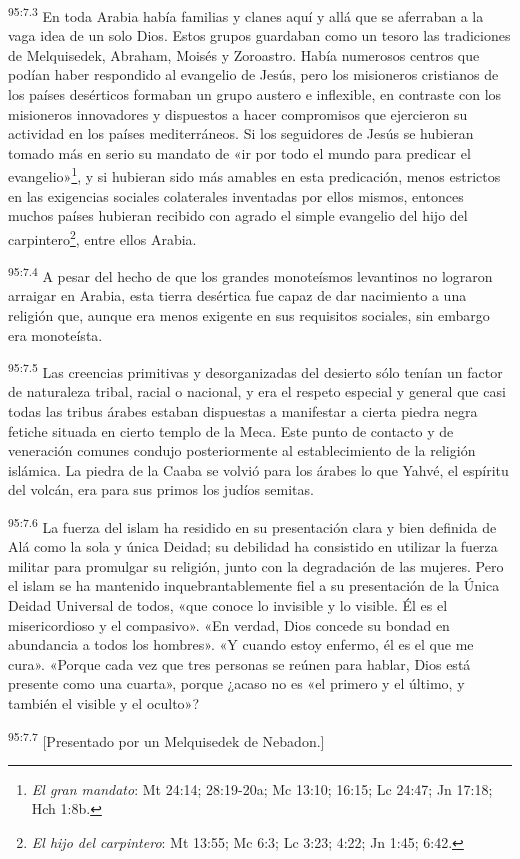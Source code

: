 \par
\textsuperscript{95:7.3} En toda Arabia había familias y clanes aquí y allá que se aferraban a la vaga idea de un solo Dios. Estos grupos guardaban como un tesoro las tradiciones de Melquisedek, Abraham, Moisés y Zoroastro. Había numerosos centros que podían haber respondido al evangelio de Jesús, pero los misioneros cristianos de los países desérticos formaban un grupo austero e inflexible, en contraste con los misioneros innovadores y dispuestos a hacer compromisos que ejercieron su actividad en los países mediterráneos. Si los seguidores de Jesús se hubieran tomado más en serio su mandato de «ir por todo el mundo para predicar el evangelio»\footnote{\textit{El gran mandato}: Mt 24:14; 28:19-20a; Mc 13:10; 16:15; Lc 24:47; Jn 17:18; Hch 1:8b.}, y si hubieran sido más amables en esta predicación, menos estrictos en las exigencias sociales colaterales inventadas por ellos mismos, entonces muchos países hubieran recibido con agrado el simple evangelio del hijo del carpintero\footnote{\textit{El hijo del carpintero}: Mt 13:55; Mc 6:3; Lc 3:23; 4:22; Jn 1:45; 6:42.}, entre ellos Arabia.

\par
\textsuperscript{95:7.4} A pesar del hecho de que los grandes monoteísmos levantinos no lograron arraigar en Arabia, esta tierra desértica fue capaz de dar nacimiento a una religión que, aunque era menos exigente en sus requisitos sociales, sin embargo era monoteísta.

\par
\textsuperscript{95:7.5} Las creencias primitivas y desorganizadas del desierto sólo tenían un factor de naturaleza tribal, racial o nacional, y era el respeto especial y general que casi todas las tribus árabes estaban dispuestas a manifestar a cierta piedra negra fetiche situada en cierto templo de la Meca. Este punto de contacto y de veneración comunes condujo posteriormente al establecimiento de la religión islámica. La piedra de la Caaba se volvió para los árabes lo que Yahvé, el espíritu del volcán, era para sus primos los judíos semitas.

\par
\textsuperscript{95:7.6} La fuerza del islam ha residido en su presentación clara y bien definida de Alá como la sola y única Deidad; su debilidad ha consistido en utilizar la fuerza militar para promulgar su religión, junto con la degradación de las mujeres. Pero el islam se ha mantenido inquebrantablemente fiel a su presentación de la Única Deidad Universal de todos, «que conoce lo invisible y lo visible.
Él es el misericordioso y el compasivo». «En verdad, Dios concede su bondad en abundancia a todos los hombres». «Y cuando estoy enfermo, él es el que me cura». «Porque cada vez que tres personas se reúnen para hablar, Dios está presente como una cuarta», porque ¿acaso no es «el primero y el último, y también el visible y el oculto»?

\par
\textsuperscript{95:7.7} [Presentado por un Melquisedek de Nebadon.]